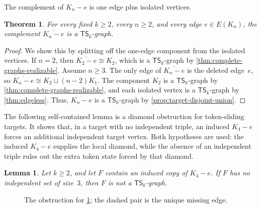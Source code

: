 \documentclass[a4paper]{article}
\theoremstyle{plain}
\newtheorem{theorem}{Theorem}[section]
\newtheorem{lemma}[lemma]{Lemma}
\theoremstyle{definition}
\newcommand{\TSsym}{\mathsf{TS}}
\numberwithin{equation}{section}
\begin{document}
The complement of $K_n-e$ is one edge plus isolated vertices.

\begin{theorem}
\label{thm:complement-complete-minus-edge}
For every fixed $k\ge 2$, every $n\ge 2$, and every edge $e\in E(K_n)$, the complement $\overline{K_n-e}$ is a $\TSsym_k$-graph.
\end{theorem}

\begin{proof}
We show this by splitting off the one-edge component from the isolated vertices.
If $n=2$, then $\overline{K_2-e}\cong K_2$, which is a $\TSsym_k$-graph by \cref{thm:complete-graphs-realizable}.
Assume $n\ge 3$.
The only edge of $\overline{K_n-e}$ is the deleted edge~$e$, so $\overline{K_n-e}\cong K_2\sqcup (n-2)K_1$.
The component $K_2$ is a $\TSsym_k$-graph by \cref{thm:complete-graphs-realizable}, and each isolated vertex is a $\TSsym_k$-graph by \cref{thm:edgeless}.
Thus, $\overline{K_n-e}$ is a $\TSsym_k$-graph by \cref{prop:target-disjoint-union}.
\end{proof}

The following self-contained lemma is a diamond obstruction for token-sliding targets.
It shows that, in a target with no independent triple, an induced $K_4-e$ forces an additional independent target vertex.
Both hypotheses are used: the induced $K_4-e$ supplies the local diamond, while the absence of an independent triple rules out the extra token state forced by that diamond.

\begin{lemma}
\label{lem:diamond-independent-obstruction}
Let $k\ge 2$, and let $F$ contain an induced copy of $K_4-e$.
If $F$ has no independent set of size~$3$, then $F$ is not a $\TSsym_k$-graph.
\end{lemma}

\begin{figure}[ht]
\centering

\caption{The obstruction for \cref{lem:diamond-independent-obstruction}; the dashed pair is the unique missing edge.}
\label{fig:k4-minus-edge}
\end{figure}
\end{document}
